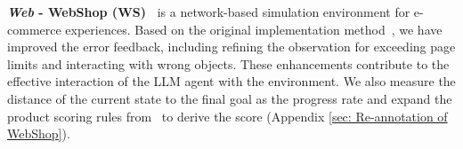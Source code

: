 \textbf{\textit{Web} - WebShop (WS)~\citep{yao2022webshop}}
is a network-based simulation environment for e-commerce experiences. %
Based on the original implementation method~\citep{yao2022webshop,shinn2023reflexion}, we have improved the error feedback, including refining the observation for exceeding page limits and interacting with wrong objects. These enhancements contribute to the effective interaction of the LLM agent with the environment.
We also measure the distance of the current state to the final goal as the progress rate and expand the product scoring rules from~\citet{yao2022webshop} to derive the score (Appendix \ref{sec: Re-annotation of WebShop}). 



